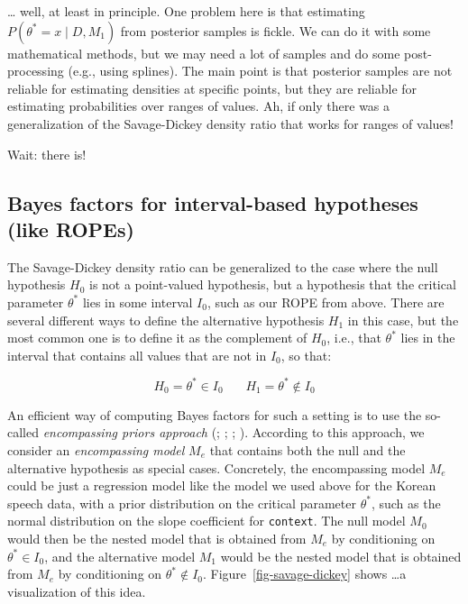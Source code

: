 \documentclass[
  doc,
  floatsintext,
  longtable,
  nolmodern,
  notxfonts,
  notimes,
  colorlinks=true,linkcolor=blue,citecolor=blue,urlcolor=blue]{apa7}
\begin{document}
\ldots{} well, at least in principle. One problem here is that
estimating \(P(\theta^*=x \mid D, M_1)\) from posterior samples is
fickle. We can do it with some mathematical methods, but we may need a
lot of samples and do some post-processing (e.g., using splines). The
main point is that posterior samples are not reliable for estimating
densities at specific points, but they are reliable for estimating
probabilities over ranges of values. Ah, if only there was a
generalization of the Savage-Dickey density ratio that works for ranges
of values!

Wait: there is!

\subsection{Bayes factors for interval-based hypotheses (like
ROPEs)}\label{bayes-factors-for-interval-based-hypotheses-like-ropes}

The Savage-Dickey density ratio can be generalized to the case where the
null hypothesis \(H_0\) is not a point-valued hypothesis, but a
hypothesis that the critical parameter \(\theta^*\) lies in some
interval \(I_0\), such as our ROPE from above. There are several
different ways to define the alternative hypothesis \(H_1\) in this
case, but the most common one is to define it as the complement of
\(H_0\), i.e., that \(\theta^*\) lies in the interval that contains all
values that are not in \(I_0\), so that:

\[
H_0 = \theta^* \in I_0 \ \ \ \ \ \ \ \  H_1 = \theta^* \not \in I_0
\]

An efficient way of computing Bayes factors for such a setting is to use
the so-called \emph{encompassing priors approach}
(;
; ;
). According to this approach, we consider an \emph{encompassing
model} \(M_e\) that contains both the null and the alternative
hypothesis as special cases. Concretely, the encompassing model \(M_e\)
could be just a regression model like the model we used above for the
Korean speech data, with a prior distribution on the critical parameter
\(\theta^*\), such as the normal distribution on the slope coefficient
for \texttt{context}. The null model \(M_0\) would then be the nested
model that is obtained from \(M_e\) by conditioning on
\(\theta^* \in I_0\), and the alternative model \(M_1\) would be the
nested model that is obtained from \(M_e\) by conditioning on
\(\theta^* \not \in I_0\). Figure~\ref{fig-savage-dickey} shows \ldots a
visualization of this idea.
\end{document}
